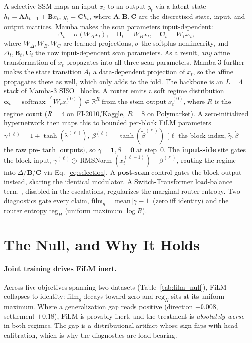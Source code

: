 \documentclass{article}
\newcommand{\R}{\mathbb{R}}
\DeclareMathOperator{\softmaxop}{softmax}
\newcommand{\softmax}{\softmaxop}
\DeclareMathOperator{\RMSNorm}{RMSNorm}
\begin{document}
A selective SSM maps an input $x_t$ to an output $y_t$ via a latent state
$h_t=\bar{\mathbf{A}}h_{t-1}+\bar{\mathbf{B}}x_t$, $y_t=\mathbf{C}h_t$, where
$\bar{\mathbf{A}},\bar{\mathbf{B}},\mathbf{C}$ are the discretized state, input,
and output matrices. Mamba makes the scan parameters input-dependent:
\begin{equation}\label{eq:selection}
\Delta_t=\sigma(W_\Delta x_t),\quad \mathbf{B}_t=W_B x_t,\quad \mathbf{C}_t=W_C x_t,
\end{equation}
where $W_\Delta,W_B,W_C$ are learned projections, $\sigma$ the softplus nonlinearity, and $\Delta_t,\mathbf{B}_t,\mathbf{C}_t$ the now input-dependent scan parameters. As a result, \emph{any} affine transformation of $x_t$ propagates into all three scan
parameters. Mamba-3 further makes the state transition $A_t$ a data-dependent
projection of $x_t$, so the affine propagates there as well, which only adds to the
fold. The backbone is an $L{=}4$ stack of Mamba-3
SISO~\citep{lahoti2026mamba3} blocks. A router emits a soft regime distribution
$\bm{\alpha}_t=\softmax(W_r x_t^{(0)})\in\R^R$ from the stem output $x_t^{(0)}$,
where $R$ is the regime count ($R{=}4$ on FI-2010/Kaggle, $R{=}8$ on Polymarket).
A zero-initialized hypernetwork then maps this to bounded per-block FiLM
parameters $\gamma^{(\ell)}=1+\tanh(\tilde\gamma^{(\ell)})$,
$\beta^{(\ell)}=\tanh(\tilde\beta^{(\ell)})$ ($\ell$ the block index,
$\tilde\gamma,\tilde\beta$ the raw pre-$\tanh$ outputs), so
$\gamma{=}\mathbf{1},\beta{=}\mathbf{0}$ at step~0. The \textbf{input-side} site gates the block input,
$\gamma^{(\ell)}\odot\RMSNorm(x_t^{(\ell-1)})+\beta^{(\ell)}$, routing the regime
into $\Delta/\mathbf{B}/\mathbf{C}$ via Eq.~\eqref{eq:selection}. A
\textbf{post-scan} control gates the block output instead, sharing the identical
modulator. A Switch-Transformer load-balance term~\citep{fedus2022switch},
disabled in the escalations, regularizes the marginal router entropy. Two
diagnostics gate every claim, $\mathrm{film}_g=\mathrm{mean}\,|\gamma-1|$ (zero iff
identity) and the router entropy $\mathrm{reg}_H$ (uniform maximum $\log R$).

\section{The Null, and Why It Holds}\label{sec:null}

\paragraph{Joint training drives FiLM inert.}
Across five objectives spanning two datasets (Table~\ref{tab:film_null}), FiLM
collapses to identity: $\mathrm{film}_g$ decays toward zero and $\mathrm{reg}_H$ sits at its
uniform maximum. Where a generalization gap reads
positive (direction $+0.008$, settlement $+0.18$), FiLM is provably inert, and the
treatment is \emph{absolutely worse} in both regimes. The gap is a distributional
artifact whose sign flips with head calibration, which is why the diagnostics are
load-bearing.
\end{document}

